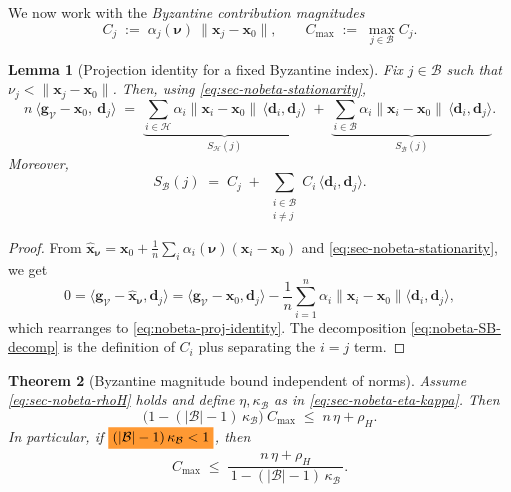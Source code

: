 \documentclass{article}
\theoremstyle{plain}
\newtheorem{theorem}{Theorem}[section]
\newtheorem{lemma}[theorem]{Lemma}
\theoremstyle{definition}
\theoremstyle{remark}
\begin{document}
We now work with the \emph{Byzantine contribution magnitudes}
\begin{equation}
C_j \;:=\; \alpha_j(\bm{\nu})\ \|\bm{x}_j-\bm{x}_0\|,
\qquad
C_{\max} \;:=\; \max_{j\in\mathcal{B}} C_j .
\label{eq:sec-nobeta-Cdefs}
\end{equation}

\begin{lemma}[Projection identity for a fixed Byzantine index]
\label{lem:nobeta-proj}
Fix $j\in\mathcal{B}$ such that $\nu_j<\|\bm{x}_j-\bm{x}_0\|$.
Then, using \eqref{eq:sec-nobeta-stationarity},
\begin{equation}
n\ \bigl\langle \bm{g}_{\mathcal{V}}-\bm{x}_0,\ \bm{d}_j\bigr\rangle
\;=\;
\underbrace{\sum_{i\in\mathcal{H}}\alpha_i\|\bm{x}_i-\bm{x}_0\|\,\langle \bm{d}_i,\bm{d}_j\rangle}_{S_{\mathcal{H}}(j)}
\;+\;
\underbrace{\sum_{i\in\mathcal{B}}\alpha_i\|\bm{x}_i-\bm{x}_0\|\,\langle \bm{d}_i,\bm{d}_j\rangle}_{S_{\mathcal{B}}(j)}.
\label{eq:nobeta-proj-identity}
\end{equation}
Moreover,
\begin{equation}
S_{\mathcal{B}}(j) \;=\; C_j \;+\;
\sum_{\substack{i\in\mathcal{B}\\ i\neq j}}
C_i\,\langle \bm{d}_i,\bm{d}_j\rangle .
\label{eq:nobeta-SB-decomp}
\end{equation}
\end{lemma}

\begin{proof}
From $\hat{\bm{x}}_{\bm{\nu}}=\bm{x}_0+\frac1n\sum_i \alpha_i(\bm{\nu})(\bm{x}_i-\bm{x}_0)$ and
\eqref{eq:sec-nobeta-stationarity}, we get
\[
0=\bigl\langle \bm{g}_{\mathcal{V}}-\hat{\bm{x}}_{\bm{\nu}},\bm{d}_j\bigr\rangle
=\bigl\langle \bm{g}_{\mathcal{V}}-\bm{x}_0,\bm{d}_j\bigr\rangle
-\frac1n \sum_{i=1}^n \alpha_i\|\bm{x}_i-\bm{x}_0\|\langle \bm{d}_i,\bm{d}_j\rangle,
\]
which rearranges to \eqref{eq:nobeta-proj-identity}. The decomposition
\eqref{eq:nobeta-SB-decomp} is the definition of $C_i$ plus separating the $i=j$ term.
\end{proof}

\begin{theorem}[Byzantine magnitude bound independent of norms]
\label{thm:nobeta-Cmax}
Assume \eqref{eq:sec-nobeta-rhoH} holds and define $\eta,\kappa_{\mathcal{B}}$ as in
\eqref{eq:sec-nobeta-eta-kappa}. Then
\begin{equation}
\bigl(1-(|\mathcal{B}|-1)\,\kappa_{\mathcal{B}}\bigr)\ C_{\max}
\;\le\;
n\,\eta + \rho_H.
\label{eq:nobeta-Cmax-core}
\end{equation}
In particular, if 
$
  \colorbox{alert}{%
    $\displaystyle
        (|\mathcal{B}|-1)\,\kappa_{\mathcal{B}}<1
    $%
  }
$, then
\begin{equation}
\boxed{\;
C_{\max}
\;\le\;
\frac{n\,\eta + \rho_H}{\,1-(|\mathcal{B}|-1)\,\kappa_{\mathcal{B}}\,}.
\;}
\label{eq:nobeta-Cmax}
\end{equation}
\end{theorem}
\end{document}
